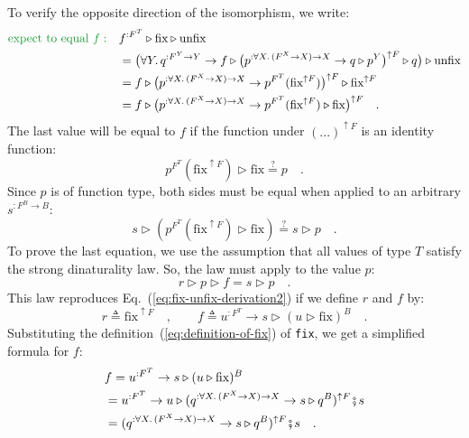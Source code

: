 To verify the opposite direction of the isomorphism, we write:
\begin{align*}
{\color{greenunder}\text{expect to equal }f:}\quad & f^{:F^{T}}\triangleright\text{fix}\triangleright\text{unfix}\\
 & =\big(\forall Y.\,q^{:F^{Y}\rightarrow Y}\rightarrow f\triangleright\big(p^{:\forall X.\,(F^{X}\rightarrow X)\rightarrow X}\rightarrow q\triangleright p^{Y}\big)^{\uparrow F}\triangleright q\big)\triangleright\text{unfix}\\
 & =f\triangleright\big(p^{:\forall X.\,(F^{X}\rightarrow X)\rightarrow X}\rightarrow p^{F^{T}}(\text{fix}^{\uparrow F})\big)^{\uparrow F}\triangleright\text{fix}^{\uparrow F}\\
 & =f\triangleright\big(p^{:\forall X.\,(F^{X}\rightarrow X)\rightarrow X}\rightarrow p^{F^{T}}(\text{fix}^{\uparrow F})\triangleright\text{fix}\big)^{\uparrow F}\quad.
\end{align*}
The last value will be equal to $f$ if the function under $(...)^{\uparrow F}$
is an identity function:
\[
p^{F^{T}}(\text{fix}^{\uparrow F})\triangleright\text{fix}\overset{?}{=}p\quad.
\]
Since $p$ is of function type, both sides must be equal when applied
to an arbitrary $s^{:F^{B}\rightarrow B}$:
\begin{equation}
s\triangleright(p^{F^{T}}(\text{fix}^{\uparrow F})\triangleright\text{fix})\overset{?}{=}s\triangleright p\quad.\label{eq:fix-unfix-derivation2}
\end{equation}
To prove the last equation, we use the assumption that all values
of type $T$ satisfy the strong dinaturality law. So, the law must
apply to the value $p$:
\[
r\triangleright p\triangleright f=s\triangleright p\quad.
\]
This law reproduces Eq.~(\ref{eq:fix-unfix-derivation2}) if we define
$r$ and $f$ by:
\[
r\triangleq\text{fix}^{\uparrow F}\quad,\quad\quad f\triangleq u^{:F^{T}}\rightarrow s\triangleright(u\triangleright\text{fix})^{B}\quad.
\]
Substituting the definition~(\ref{eq:definition-of-fix}) of \lstinline!fix!,
we get a simplified formula for $f$:
\begin{align*}
 & f=u^{:F^{T}}\rightarrow s\triangleright(u\triangleright\text{fix})^{B}\\
 & =u^{:F^{T}}\rightarrow u\triangleright(q^{:\forall X.\,(F^{X}\rightarrow X)\rightarrow X}\rightarrow s\triangleright q^{B})^{\uparrow F}\bef s\\
 & =(q^{:\forall X.\,(F^{X}\rightarrow X)\rightarrow X}\rightarrow s\triangleright q^{B})^{\uparrow F}\bef s\quad.
\end{align*}
